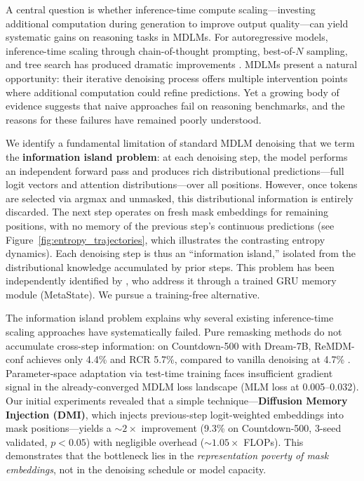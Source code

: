 \documentclass{article}
\begin{document}
A central question is whether inference-time compute scaling---investing additional computation during generation to improve output quality---can yield systematic gains on reasoning tasks in MDLMs. For autoregressive models, inference-time scaling through chain-of-thought prompting, best-of-$N$ sampling, and tree search has produced dramatic improvements \citep{zhang2025its, ji2025its}. MDLMs present a natural opportunity: their iterative denoising process offers multiple intervention points where additional computation could refine predictions. Yet a growing body of evidence suggests that naive approaches fail on reasoning benchmarks, and the reasons for these failures have remained poorly understood.

We identify a fundamental limitation of standard MDLM denoising that we term the \textbf{information island problem}: at each denoising step, the model performs an independent forward pass and produces rich distributional predictions---full logit vectors and attention distributions---over all positions. However, once tokens are selected via argmax and unmasked, this distributional information is entirely discarded. The next step operates on fresh mask embeddings for remaining positions, with no memory of the previous step's continuous predictions (see Figure~\ref{fig:entropy_trajectories}, which illustrates the contrasting entropy dynamics). Each denoising step is thus an ``information island,'' isolated from the distributional knowledge accumulated by prior steps. This problem has been independently identified by \citet{xia2026metastate}, who address it through a trained GRU memory module (MetaState). We pursue a training-free alternative.

The information island problem explains why several existing inference-time scaling approaches have systematically failed. Pure remasking methods do not accumulate cross-step information: on Countdown-500 with Dream-7B, ReMDM-conf achieves only 4.4\% and RCR 5.7\%, compared to vanilla denoising at 4.7\% \citep{arriola2025remdm, ye2025rcr}. Parameter-space adaptation via test-time training faces insufficient gradient signal in the already-converged MDLM loss landscape (MLM loss at 0.005--0.032). Our initial experiments revealed that a simple technique---\textbf{Diffusion Memory Injection (DMI)}, which injects previous-step logit-weighted embeddings into mask positions---yields a ${\sim}2{\times}$ improvement (9.3\% on Countdown-500, 3-seed validated, $p < 0.05$) with negligible overhead (${\sim}1.05{\times}$ FLOPs). This demonstrates that the bottleneck lies in the \emph{representation poverty of mask embeddings}, not in the denoising schedule or model capacity.
\end{document}
